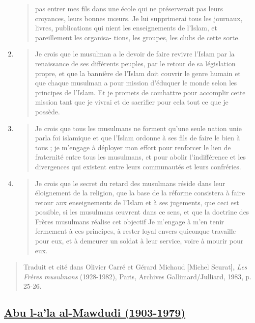 \begin{enumerate}
\begin{quote}
  pas entrer mes fils dans une école qui ne préserverait pas leurs
  croyances, leurs bonnes mœurs. Je lui supprimerai tous les journaux,
  livres, publications qui nient les enseignements de l'Islam, et
  pareillement les organisa- tions, les groupes, les clubs de cette
  sorte.
  \end{quote}
\item
  \begin{quote}
  Je crois que le musulman a le devoir de faire revivre l'Islam par la
  renaissance de ses différents peuples, par le retour de sa législation
  propre, et que la bannière de l'Islam doit couvrir le genre humain et
  que chaque musulman a pour mission d'éduquer le monde selon les
  principes de l'Islam. Et je promets de combattre pour accomplir cette
  mission tant que je vivrai et de sacrifier pour cela tout ce que je
  possède.
  \end{quote}
\item
  \begin{quote}
  Je crois que tous les musulmans ne forment qu'une seule nation unie
  parla foi islamique et que l'Islam ordonne à ses fils de faire le bien
  à tous ; je m'engage à déployer mon effort pour renforcer le lien de
  fraternité entre tous les musulmans, et pour abolir l'indifférence et
  les divergences qui existent entre leurs communautés et leurs
  confréries.
  \end{quote}
\item
  \begin{quote}
  Je crois que le secret du retard des musulmans réside dans leur
  éloignement de la religion, que la base de la réforme consistera à
  faire retour aux enseignements de l'Islam et à ses jugements, que ceci
  est possible, si les musulmans œuvrent dans ce sens, et que la
  doctrine des Frères musulmans réalise cet objectif Je m'engage à m'en
  tenir fermement à ces principes, à rester loyal envers quiconque
  travaille pour eux, et à demeurer un soldat à leur service, voire à
  mourir pour eux.
  \end{quote}
\end{enumerate}

\begin{quote}
Traduit et cité dans Olivier Carré et Gérard Michaud {[}Michel
Seurat{]}, \emph{Les Frères musulmans} (1928-1982), Paris, Archives
Gallimard/Julliard, 1983, p. 25-26.
\end{quote}

\hypertarget{abu-l-ala-al-mawdudi-1903-1979}{%
\subsection{\texorpdfstring{\underline{Abu l-a'la al-Mawdudi
(1903-1979)}}{Abu l-a'la al-Mawdudi (1903-1979)}}\label{abu-l-ala-al-mawdudi-1903-1979}}

